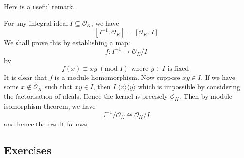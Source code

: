 Here is a useful remark.
\begin{remark} For any integral ideal $I \subseteq \mathcal{O}_K$, we have
$$[I^{-1}: \mathcal{O}_K]=[\mathcal{O}_K:I]$$
We shall prove this by establishing a map:
$$f: I^{-1} \rightarrow \mathcal{O}_K/I$$
by
$$f(x) \equiv xy~(\text{mod } I) \text{ where } y \in I \text{ is fixed }$$
It is clear that $f$ is a module homomorphism. Now suppose $xy \in I$. If we have some $x \not \in \mathcal{O}_K$
such that $xy \in I$, then $I |\langle x \rangle \langle y \rangle$ which is impossible by considering the factorisation of ideals. Hence the kernel is precisely $\mathcal{O}_K$. Then by module isomorphism theorem, we have
$$I^{-1}/\mathcal{O}_K \cong \mathcal{O}_K/I$$
and hence the result follows.
\end{remark}
\subsection{Exercises}
